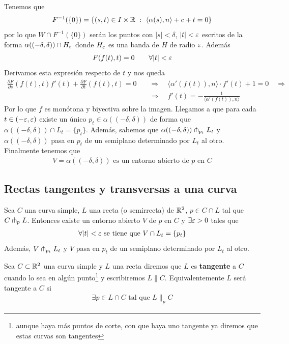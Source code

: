 Tenemos que 
\begin{gather*}
    F^{-1}(\{0\}) = \{(s,t)\in I \times \mathbb{R} \ : \ \langle \alpha(s), n \rangle + c + t = 0\}
\end{gather*}
por lo que $W \cap F^{-1}(\{0\})$ serán los puntos con $|s| < \delta$, $|t|<\varepsilon$ escritos de la forma $\alpha((-\delta, \delta))\cap H_\varepsilon$ donde $H_\varepsilon$ es una banda de $H$ de radio $\varepsilon$. Además
\begin{gather*}
    F(f(t), t) = 0 \qquad \forall |t|<\varepsilon
\end{gather*}
Derivamos esta expresión respecto de $t$ y nos queda
\begin{align*}
    \frac{\partial F}{\partial s}(f(t), t)f'(t) + \frac{\partial F}{\partial t}(f(t), t) = 0\quad
    &\Rightarrow \quad
    \langle \alpha'(f(t)), n \rangle \cdot f'(t) + 1 = 0\quad
    \Rightarrow\\
    &\Rightarrow \quad
    f'(t) = - \frac{1}{\langle \alpha'(f(t)), n \rangle}
\end{align*}
Por lo que $f$ es monótona y biyectiva sobre la imagen. Llegamos a que 
para cada $t\in (-\varepsilon, \varepsilon)$ existe un único $p_t\in \alpha((-\delta, \delta))$ de forma que $\alpha((-\delta, \delta))\cap L_t = \{p_t\}$. Además, sabemos que $\alpha((-\delta, \delta)) \pitchfork_{p_t} L_t$ y $\alpha((-\delta, \delta))$ pasa en $p_t$ de un semiplano determinado por $L_t$ al otro. Finalmente tenemos que
\begin{gather*}
    V=\alpha((-\delta, \delta)) \text{ es un entorno abierto de $p$ en $C$}
\end{gather*}

\subsection{Rectas tangentes y transversas a una curva}

\begin{lema}\label{lema:transv}
    Sea $C$ una curva simple, $L$ una recta (o semirrecta) de $\mathbb{R}^2$, $p\in C\cap L$ tal que $C \pitchfork_p L$. Entonces existe un entorno abierto $V$ de $p$ en $C$ y $\exists \varepsilon >0$ tales que 
    \begin{gather*}
        \forall |t| < \varepsilon \text{ se tiene que } V\cap L_t = \{p_t\}
    \end{gather*}
    Además, $V \pitchfork_{p_t}L_t$ y $V$ pasa en $p_t$ de un semiplano determinado por $L_t$ al otro.
\end{lema}

\begin{definicion}\label{def:tang}
    Sea $C\subset \mathbb{R}^2$ una curva simple y $L$ una recta diremos que $L$ es \textbf{tangente} a $C$ cuando lo sea en algún punto\footnote{aunque haya más puntos de corte, con que haya uno tangente ya diremos que estas curvas son tangentes} y escribiremos $L \| C$. Equivalentemente $L$ será tangente a $C$ si
    \begin{gather*}
        \exists p\in L\cap C \text{ tal que } L \|_p C
    \end{gather*}
\end{definicion}

